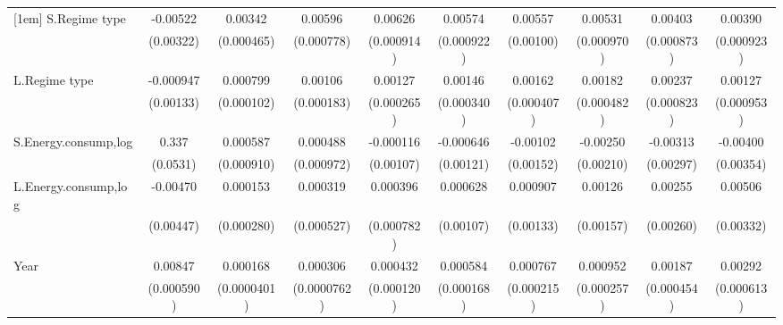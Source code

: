 \begin{table}[htbp]
\begin{tabular}{l*{9}{c}}
[1em]
S.Regime type       &    -0.00522         &     0.00342\sym{***}&     0.00596\sym{***}&     0.00626\sym{***}&     0.00574\sym{***}&     0.00557\sym{***}&     0.00531\sym{***}&     0.00403\sym{***}&     0.00390\sym{***}\\
                    &   (0.00322)         &  (0.000465)         &  (0.000778)         &  (0.000914)         &  (0.000922)         &   (0.00100)         &  (0.000970)         &  (0.000873)         &  (0.000923)         \\
[1em]
L.Regime type       &   -0.000947         &    0.000799\sym{***}&     0.00106\sym{***}&     0.00127\sym{***}&     0.00146\sym{***}&     0.00162\sym{***}&     0.00182\sym{***}&     0.00237\sym{***}&     0.00127         \\
                    &   (0.00133)         &  (0.000102)         &  (0.000183)         &  (0.000265)         &  (0.000340)         &  (0.000407)         &  (0.000482)         &  (0.000823)         &  (0.000953)         \\
[1em]
S.Energy.consump,log&       0.337\sym{***}&    0.000587         &    0.000488         &   -0.000116         &   -0.000646         &    -0.00102         &    -0.00250         &    -0.00313         &    -0.00400         \\
                    &    (0.0531)         &  (0.000910)         &  (0.000972)         &   (0.00107)         &   (0.00121)         &   (0.00152)         &   (0.00210)         &   (0.00297)         &   (0.00354)         \\
[1em]
L.Energy.consump,log&    -0.00470         &    0.000153         &    0.000319         &    0.000396         &    0.000628         &    0.000907         &     0.00126         &     0.00255         &     0.00506         \\
                    &   (0.00447)         &  (0.000280)         &  (0.000527)         &  (0.000782)         &   (0.00107)         &   (0.00133)         &   (0.00157)         &   (0.00260)         &   (0.00332)         \\
[1em]
Year                &     0.00847\sym{***}&    0.000168\sym{***}&    0.000306\sym{***}&    0.000432\sym{***}&    0.000584\sym{***}&    0.000767\sym{***}&    0.000952\sym{***}&     0.00187\sym{***}&     0.00292\sym{***}\\
                    &  (0.000590)         & (0.0000401)         & (0.0000762)         &  (0.000120)         &  (0.000168)         &  (0.000215)         &  (0.000257)         &  (0.000454)         &  (0.000613)         \\

\end{tabular}
\end{table}
